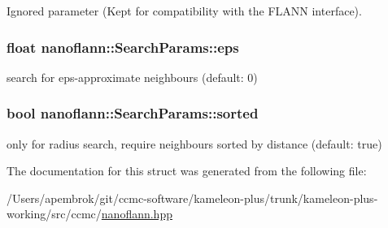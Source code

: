 Ignored parameter (Kept for compatibility with the F\-L\-A\-N\-N interface). 

\hypertarget{structnanoflann_1_1_search_params_a64b9e7c56bbb743694f6188f616a94cc}{
\subsubsection[{eps}]{\setlength{\rightskip}{0pt plus 5cm}float nanoflann\-::\-Search\-Params\-::eps}}\label{structnanoflann_1_1_search_params_a64b9e7c56bbb743694f6188f616a94cc}


search for eps-\/approximate neighbours (default\-: 0) 

\hypertarget{structnanoflann_1_1_search_params_a5126d5f71f1c9163c6a581776a0e9466}{
\subsubsection[{sorted}]{\setlength{\rightskip}{0pt plus 5cm}bool nanoflann\-::\-Search\-Params\-::sorted}}\label{structnanoflann_1_1_search_params_a5126d5f71f1c9163c6a581776a0e9466}


only for radius search, require neighbours sorted by distance (default\-: true) 



The documentation for this struct was generated from the following file\-:\begin{DoxyCompactItemize}
\item 
/\-Users/apembrok/git/ccmc-\/software/kameleon-\/plus/trunk/kameleon-\/plus-\/working/src/ccmc/\hyperlink{nanoflann_8hpp}{nanoflann.\-hpp}\end{DoxyCompactItemize}

